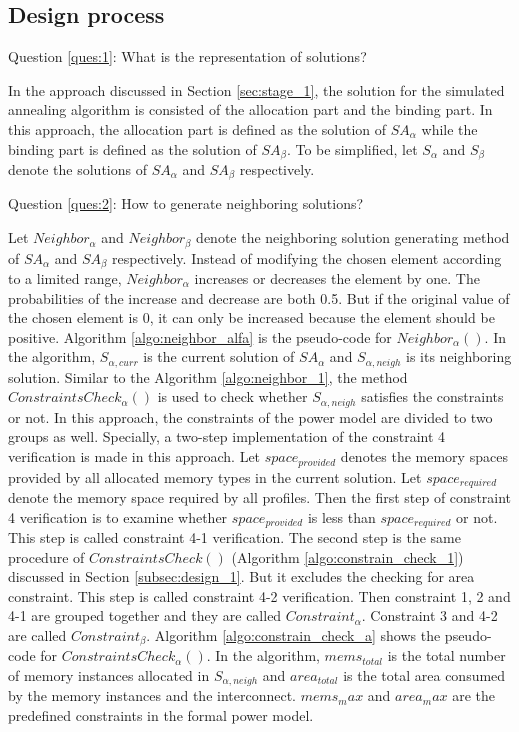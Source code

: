 		\subsection{Design process}
		\label{subsec:design_2}
		Question \ref{ques:1}: What is the representation of solutions?
		
		In the approach discussed in Section \ref{sec:stage_1}, the solution for the
		simulated annealing algorithm is consisted of the allocation part and the
		binding part. In this approach, the allocation part is defined as the
		solution of $SA_{\alpha}$ while the binding part is defined as the solution
		of $SA_{\beta}$. To be simplified, let $S_{\alpha}$ and $S_{\beta}$ denote
		the solutions of $SA_{\alpha}$ and $SA_{\beta}$ respectively.
		
		Question \ref{ques:2}: How to generate neighboring solutions?
		
		Let $Neighbor_{\alpha}$ and $Neighbor_{\beta}$ denote the neighboring
		solution generating method of $SA_{\alpha}$ and $SA_{\beta}$ respectively.
		Instead of modifying the chosen element according to a limited range,
		$Neighbor_{\alpha}$ increases or decreases the element by one. 
		The probabilities of the increase and decrease are both 0.5.
		But if the original value of the chosen element is 0, it can only be
		increased because the element should be positive.
		Algorithm \ref{algo:neighbor_alfa} is the pseudo-code for $Neighbor_{\alpha}()$.
		In the algorithm, $S_{\alpha,curr}$ is the current solution of
		$SA_{\alpha}$ and $S_{\alpha,neigh}$ is its neighboring solution.
		Similar to the Algorithm \ref{algo:neighbor_1}, the method
		$ConstraintsCheck_{\alpha}()$ is used to check whether $S_{\alpha,neigh}$
		satisfies the constraints or not.
		In this approach, the constraints of the power model are divided to two
		groups as well.
		Specially, a two-step implementation of the constraint 4 verification
		is made in this approach.
		Let $space_{provided}$ denotes the memory spaces provided by all allocated
		memory types in the current solution.
		Let $space_{required}$ denote the memory space required by all profiles.
		Then the first step of constraint 4 verification is to examine whether
		$space_{provided}$ is less than $space_{required}$ or not. This step is
		called constraint 4-1 verification.
		The second step is the same procedure of $ConstraintsCheck()$
		(Algorithm \ref{algo:constrain_check_1}) discussed in Section \ref{subsec:design_1}.
		But it excludes the checking for area constraint. This step is called
		constraint 4-2 verification.
		Then constraint 1, 2 and 4-1 are grouped together and they are called $Constraint_{\alpha}$.
		Constraint 3 and 4-2 are called $Constraint_{\beta}$.
		Algorithm \ref{algo:constrain_check_a} shows the pseudo-code for $ConstraintsCheck_{\alpha}()$.
		In the algorithm, $mems_{total}$ is the total number of memory instances allocated in
		$S_{\alpha,neigh}$ and $area_{total}$ is the total area consumed by the memory
		instances and the interconnect.
		$mems_max$ and $area_max$ are the predefined constraints in
		the formal power model.
		
		
	
